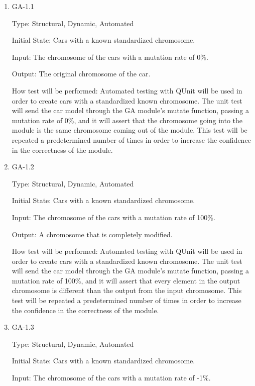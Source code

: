 \documentclass[12pt, titlepage]{article}
\begin{document}
\begin{enumerate}

\item{GA-1.1\\}

Type: Structural, Dynamic, Automated
					
Initial State: Cars with a known standardized chromosome. 
					
Input: The chromosome of the cars with a mutation rate of 0\%.
					
Output: The original chromosome of the car.
					
How test will be performed: Automated testing with QUnit will be used in order to create cars with a standardized known chromosome. The unit test will send the car model through the GA module's mutate function, passing a mutation rate of 0\%, and it will assert that the chromosome going into the module is the same chromosome coming out of the module. This test will be repeated  a predetermined number of times in order to increase the confidence in the correctness of the module.
					
\item{GA-1.2\\}

Type: Structural, Dynamic, Automated
					
Initial State: Cars with a known standardized chromosome. 
					
Input: The chromosome of the cars with a mutation rate of 100\%.
					
Output: A chromosome that is completely modified.
					
How test will be performed: Automated testing with QUnit will be used in order to create cars with a standardized known chromosome. The unit test will send the car model through the GA module's mutate function, passing a mutation rate of 100\%, and it will assert that every element in the output chromosome is different than the output from the input chromosome. This test will be repeated  a predetermined number of times in order to increase the confidence in the correctness of the module.

\item{GA-1.3\\}

Type: Structural, Dynamic, Automated
					
Initial State: Cars with a known standardized chromosome. 
					
Input: The chromosome of the cars with a mutation rate of -1\%.
					

\end{enumerate}
\end{document}
